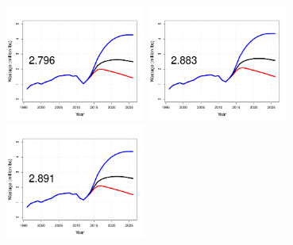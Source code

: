 \begin{figure}[htbp]
	\centering
		\includegraphics[height=1.5in]{../FIGURES/fig_SQUO_DI_WBio.pdf}
		\includegraphics[height=1.5in]{../FIGURES/fig_BSAI_DI_WBio.pdf}
		\includegraphics[height=1.5in]{../FIGURES/fig_GULF_DI_WBio.pdf}
		

\end{figure}
